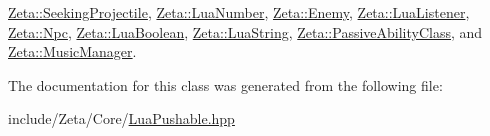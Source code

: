 \hyperlink{classZeta_1_1SeekingProjectile_a5ddeabc562a342aca955a69eba498ec3}{Zeta\+::\+Seeking\+Projectile}, \hyperlink{classZeta_1_1LuaNumber_a20dd0dac6890fe253a106613b8095350}{Zeta\+::\+Lua\+Number}, \hyperlink{classZeta_1_1Enemy_add1a2316358c32695376bed8f29f4f88}{Zeta\+::\+Enemy}, \hyperlink{classZeta_1_1LuaListener_a4cd46326ef2704e9e8fbc1506509914a}{Zeta\+::\+Lua\+Listener}, \hyperlink{classZeta_1_1Npc_a0943cb88b0b4bcc18a4c19f4c9b8b060}{Zeta\+::\+Npc}, \hyperlink{classZeta_1_1LuaBoolean_a8db81f14b50e4c0dee9fcd0a89f9df79}{Zeta\+::\+Lua\+Boolean}, \hyperlink{classZeta_1_1LuaString_a769f02cc816861d8f3a694ebe4ff330a}{Zeta\+::\+Lua\+String}, \hyperlink{classZeta_1_1PassiveAbilityClass_a2f77c91b9f09a9aebe7648de40d6d928}{Zeta\+::\+Passive\+Ability\+Class}, and \hyperlink{classZeta_1_1MusicManager_a1122a343faebeaadb193a14450586184}{Zeta\+::\+Music\+Manager}.



The documentation for this class was generated from the following file\+:\begin{DoxyCompactItemize}
\item 
include/\+Zeta/\+Core/\hyperlink{LuaPushable_8hpp}{Lua\+Pushable.\+hpp}\end{DoxyCompactItemize}
